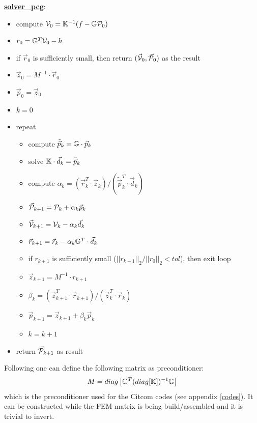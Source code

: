 \begin{mdframed}[backgroundcolor=blue!5]
\underline{\bf solver\_pcg}:
\begin{itemize}
\item compute ${\cal V}_0={\mathbb{K}}^{-1}(f-{\mathbb{G}}{\cal P}_0)$
\item $r_0 = {\mathbb{G}}^T {\cal V}_0 - h$
\item if $\vec{r}_0$ is sufficiently small, then return $(\vec{\cal V}_0,\vec{\cal P}_0)$ as the result
\item $\vec{z}_0= M^{-1} \cdot \vec{r}_0$ 
\item $\vec{p}_0=\vec{z}_0$
\item $k=0$
\item repeat
\begin{itemize}
\item compute $\tilde{\vec{p}}_k = {\mathbb{G}} \cdot \vec{p}_k$
\item solve ${\mathbb{K}}\cdot  \vec{d}_k = \tilde{\vec{p}}_k$
\item compute $\alpha_k=(\vec{r}_k^T \cdot \vec{z}_k)/(\tilde{\vec{p}}_k^T \cdot \vec{d}_k)$
\item $\vec{\cal P}_{k+1} = {\cal P}_k+\alpha_k \vec{p}_k$
\item $\vec{\cal V}_{k+1} = {\cal V}_k - \alpha_k \vec{d}_k$
\item $\vec{r}_{k+1} = \vec{r}_k - \alpha_k {\mathbb{G}}^T \cdot \vec{d}_k $
\item if $r_{k+1}$ is sufficiently small ($||r_{k+1}||_2/||r_0||_2 <tol$), then exit loop
\item $\vec{z}_{k+1}=M^{-1} \cdot r_{k+1}$
\item $\beta_k=(\vec{z}_{k+1}^T \cdot  \vec{r}_{k+1})/(\vec{z}_k^T \cdot  \vec{r}_k)$
\item $\vec{p}_{k+1} =\vec{z}_{k+1}+ \beta_k \vec{p}_k$
\item $k=k+1$
\end{itemize}
\item return $\vec{\cal P}_{k+1}$ as result
\end{itemize}
\end{mdframed}

Following \cite{zhym12} one can define the following matrix as preconditioner:
\[
M = diag \left[ {\mathbb{G}}^T (diag [{\mathbb{K}}]  )^{-1} {\mathbb{G}} \right]
\]
which is the preconditioner used for the Citcom codes (see appendix \ref{codes}). It 
can be constructed while the FEM matrix is being build/assembled
and it is trivial to invert.

















